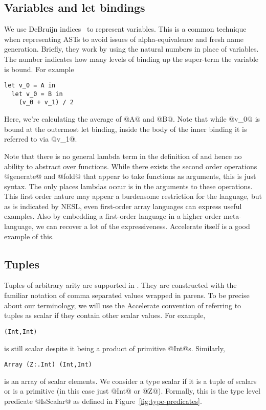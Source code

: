 \subsection{Variables and let bindings}

We use DeBruijn indices~\cite{DeBruijn1972} to represent variables. This is a common technique when representing ASTs to avoid issues of alpha-equivalence and fresh name generation. Briefly, they work by using the natural numbers in place of variables. The number indicates how many levels of binding up the super-term the variable is bound. For example
%
\begin{lstlisting}
let v_0 = A in
  let v_0 = B in
    (v_0 + v_1) / 2
\end{lstlisting}
%
Here, we're calculating the average of @A@ and @B@. Note that while @v_0@ is bound at the outermost let binding, inside the body of the inner binding it is referred to via @v_1@.

Note that there is no general lambda term in the definition of \ndp{} and hence no ability to abstract over functions. While there exists the second order operations @generate@ and @fold@ that appear to take functions as arguments, this is just syntax. The only places lambdas occur is in the arguments to these operations. This first order nature may appear a burdensome restriction for the language, but as is indicated by NESL\cite{Blelloch:nesl1995}, even first-order array languages can express useful examples. Also by embedding a first-order language in a higher order meta-language, we can recover a lot of the expressiveness. Accelerate itself is a good example of this.

\subsection{Tuples}
Tuples of arbitrary arity are supported in \ndp{}. They are constructed with the familiar notation of comma separated values wrapped in parens. To be precise about our terminology, we will use the Accelerate convention of referring to tuples as scalar if they contain other scalar values. For example,
%
\begin{lstlisting}
(Int,Int)
\end{lstlisting}
%
is still scalar despite it being a product of primitive @Int@s. Similarly,
%
\begin{lstlisting}
Array (Z:.Int) (Int,Int)
\end{lstlisting}
%
is an array of scalar elements. We consider a type scalar if it is a tuple of scalars or is a primitive (in this case just @Int@ or @Z@). Formally, this is the type level predicate @IsScalar@ as defined in Figure~\ref{fig:type-predicates}.

